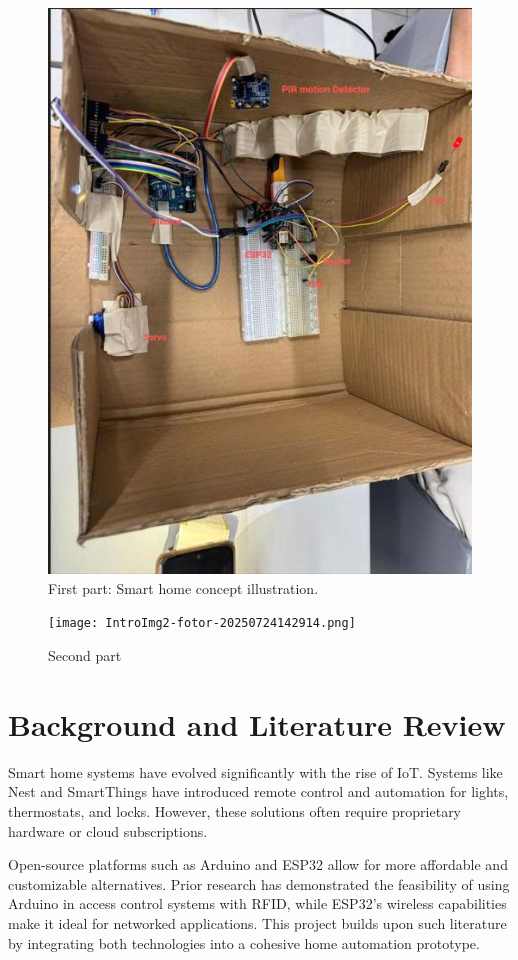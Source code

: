 \documentclass[conference, onecolumn]{IEEEtran}
\begin{document}
\begin{figure}[H]
\centering
\includegraphics[width=0.8\linewidth]{IntroImg.png}
\caption{First part: Smart home concept illustration.}
\label{fig:intro_image1}
\end{figure}

\begin{figure}[H]
\centering
\texttt{[image: IntroImg2-fotor-20250724142914.png]}
\caption{Second part}
\label{fig:intro_image2}
\end{figure}


\section{Background and Literature Review}
Smart home systems have evolved significantly with the rise of IoT. Systems like Nest and SmartThings have introduced remote control and automation for lights, thermostats, and locks. However, these solutions often require proprietary hardware or cloud subscriptions.

Open-source platforms such as Arduino and ESP32 allow for more affordable and customizable alternatives. Prior research has demonstrated the feasibility of using Arduino in access control systems with RFID, while ESP32’s wireless capabilities make it ideal for networked applications. This project builds upon such literature by integrating both technologies into a cohesive home automation prototype.
\end{document}

